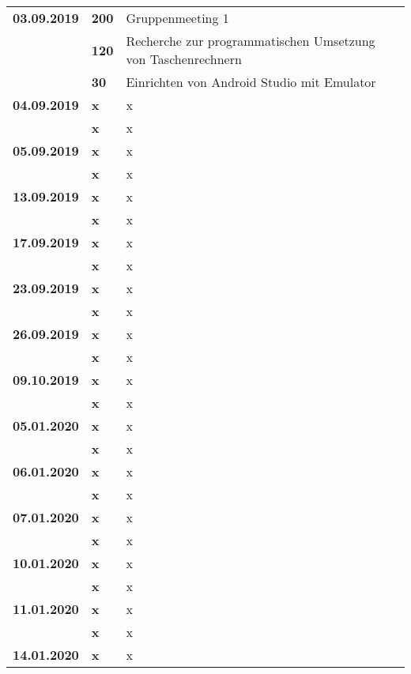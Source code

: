 {\begin{longtable}{|l|l|p{11cm}|}
		\textbf{03.09.2019} 
			& \textbf{\hfill 200} & Gruppenmeeting 1 \\\cline{2-3}
			& \textbf{\hfill 120} & Recherche zur programmatischen Umsetzung von Taschenrechnern \\\cline{2-3}
			& \textbf{\hfill 30} & Einrichten von Android Studio mit Emulator 
		 \\ \hline \textbf{04.09.2019}
			& \textbf{\hfill x} & x \\\cline{2-3}
			& \textbf{\hfill x} & x
		\\ \hline \textbf{05.09.2019}
			& \textbf{\hfill x} & x \\\cline{2-3}
			& \textbf{\hfill x} & x
		\\ \hline \textbf{13.09.2019}
			& \textbf{\hfill x} & x \\\cline{2-3}
			& \textbf{\hfill x} & x
		\\ \hline \textbf{17.09.2019}
			& \textbf{\hfill x} & x \\\cline{2-3}
			& \textbf{\hfill x} & x
		\\ \hline \textbf{23.09.2019}
			& \textbf{\hfill x} & x \\\cline{2-3}
			& \textbf{\hfill x} & x
		\\ \hline \textbf{26.09.2019}
			& \textbf{\hfill x} & x \\\cline{2-3}
			& \textbf{\hfill x} & x
		\\ \hline \textbf{09.10.2019}
			& \textbf{\hfill x} &x\\\cline{2-3}
			& \textbf{\hfill x} & x
		\\ \hline \textbf{05.01.2020}
			& \textbf{\hfill x} & x\\\cline{2-3}
			& \textbf{\hfill x} & x
		\\ \hline \textbf{06.01.2020}
			& \textbf{\hfill x} & x \\\cline{2-3}
			& \textbf{\hfill x} & x
		\\ \hline \textbf{07.01.2020}
			& \textbf{\hfill x} &x \\\cline{2-3}
			& \textbf{\hfill x} & x
		\\ \hline \textbf{10.01.2020}
			& \textbf{\hfill x} & x \\\cline{2-3}	
			& \textbf{\hfill x} & x
		\\ \hline \textbf{11.01.2020}
			& \textbf{\hfill x} & x \\\cline{2-3}
			& \textbf{\hfill x} & x
		\\ \hline \textbf{14.01.2020}
			& \textbf{\hfill x} & x \\\cline{2-3}

\end{longtable}}
